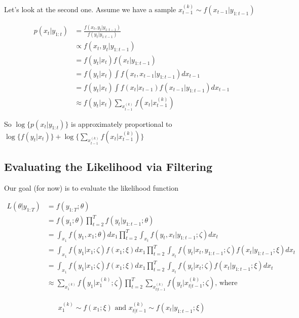 \documentclass[]{article}
\begin{document}
Let's look at the second one. Assume we have a sample
\(x_{t-1}^{(k)} \sim f(x_{t-1} | y_{1:t-1})\)

\begin{align*}
p(x_{t} | y_{1:t}) &= \frac{f(x_t, y_t | y_{1:t-1})}{f(y_t | y_{1:t-1})} \\
 &\propto f(x_t, y_t | y_{1:t-1}) \\
 &= f(y_t | x_t) f(x_t | y_{1:t-1}) \\
 &= f(y_t | x_t) \int f(x_t, x_{t-1} | y_{1:t-1}) d x_{t-1} \\
 &= f(y_t | x_t) \int f(x_t | x_{t - 1}) f(x_{t-1} | y_{1:{t-1}}) dx_{t-1} \\
 &\approx f(y_t | x_t) \sum_{x_{t-1}^{(k)}} f(x_t | x_{t - 1}^{(k)})
\end{align*}

So \(\log\{p(x_{t} | y_{1:t})\}\) is approximately proportional to
\(\log\{f(y_t | x_t)\} + \log\{\sum_{x_{t-1}^{(k)}} f(x_t | x_{t - 1}^{(k)})\}\)

\subsection{Evaluating the Likelihood via
Filtering}\label{evaluating-the-likelihood-via-filtering}

Our goal (for now) is to evaluate the likelihood function

\begin{align*}
L(\theta \vert y_{1:T}) &= f(y_{1:T} ; \theta) \\
&= f(y_1 ; \theta) \prod_{t = 2}^T f(y_t \vert y_{1:t-1} ; \theta) \\
&= \int_{x_1} f(y_1, x_1 ; \theta) d x_1 \prod_{t = 2}^T \int_{x_t} f(y_t, x_t \vert y_{1:t-1} ; \zeta) d x_{t} \\
&= \int_{x_1} f(y_1 \vert x_1 ; \zeta) f(x_1 ; \xi) d x_1 \prod_{t = 2}^T \int_{x_t} f(y_t \vert x_t, y_{1:t-1} ; \zeta) f(x_t \vert y_{1:t-1} ;\xi) d x_t \\
&= \int_{x_1} f(y_1 \vert x_1 ; \zeta) f(x_1 ; \xi) d x_1 \prod_{t = 2}^T \int_{x_t} f(y_t \vert x_t ; \zeta) f(x_t \vert y_{1:t-1} ;\xi) d x_t \\
&\approx \sum_{x_1^{(k)}} f(y_1 \vert x_1^{(k)} ; \zeta) \prod_{t = 2}^T \sum_{x_{t|t-1}^{(k)}} f(y_t \vert x_{t|t-1}^{(k)} ; \zeta) \text{, where}
\end{align*}

\begin{align*}
x_1^{(k)} \sim f(x_1 ; \xi) \text{ and }
x_{t|t-1}^{(k)} \sim f(x_t \vert y_{1:t-1} ;\xi)
\end{align*}
\end{document}
